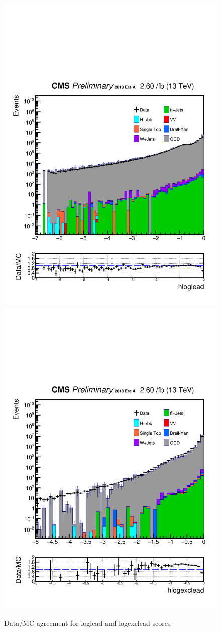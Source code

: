\begin{figure}[h!]
  \caption{Data/MC agreement for loglead and logexclead scores}
  \label{fig:DataMCscore}
  \centering
  \includegraphics[width=0.67\linewidth]{figs/Data_log_AnalysisNote_MS-15_ctauS-10_hloglead.pdf}
  \includegraphics[width=0.67\linewidth]{figs/Data_log_AnalysisNote_MS-15_ctauS-10_hlogexclead.pdf}
\end{figure}

